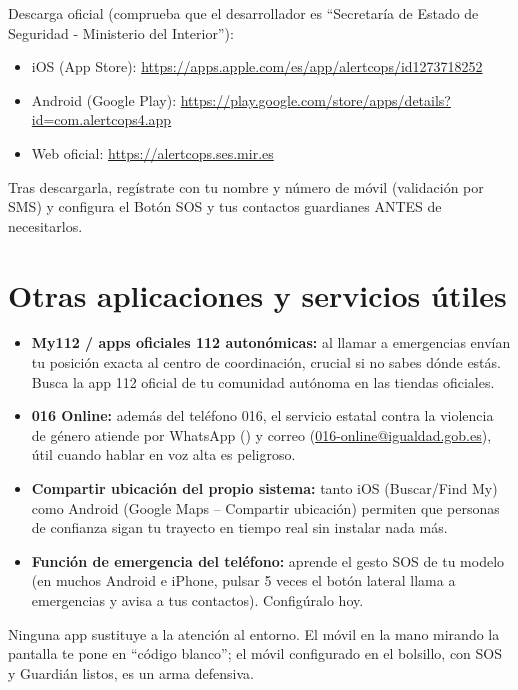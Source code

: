 Descarga oficial (comprueba que el desarrollador es \enquote{Secretaría de Estado de Seguridad - Ministerio del Interior}):

\begin{itemize}
  \item iOS (App Store): \url{https://apps.apple.com/es/app/alertcops/id1273718252}
  \item Android (Google Play): \url{https://play.google.com/store/apps/details?id=com.alertcops4.app}
  \item Web oficial: \url{https://alertcops.ses.mir.es}
\end{itemize}

Tras descargarla, regístrate con tu nombre y número de móvil (validación por SMS) y configura el Botón SOS y tus contactos guardianes ANTES de necesitarlos.

\section{Otras aplicaciones y servicios útiles}

\begin{itemize}
  \item \textbf{My112 / apps oficiales 112 autonómicas:} al llamar a emergencias envían tu posición exacta al centro de coordinación, crucial si no sabes dónde estás. Busca la app 112 oficial de tu comunidad autónoma en las tiendas oficiales.
  \item \textbf{016 Online:} además del teléfono 016, el servicio estatal contra la violencia de género atiende por WhatsApp () y correo (\href{mailto:016-online@igualdad.gob.es}{016-online@igualdad.gob.es}), útil cuando hablar en voz alta es peligroso.
  \item \textbf{Compartir ubicación del propio sistema:} tanto iOS (Buscar/Find My) como Android (Google Maps -- Compartir ubicación) permiten que personas de confianza sigan tu trayecto en tiempo real sin instalar nada más.
  \item \textbf{Función de emergencia del teléfono:} aprende el gesto SOS de tu modelo (en muchos Android e iPhone, pulsar 5 veces el botón lateral llama a emergencias y avisa a tus contactos). Configúralo hoy.
\end{itemize}

\begin{consejo}
Ninguna app sustituye a la atención al entorno. El móvil en la mano mirando la pantalla te pone en \enquote{código blanco}; el móvil configurado en el bolsillo, con SOS y Guardián listos, es un arma defensiva.
\end{consejo}
